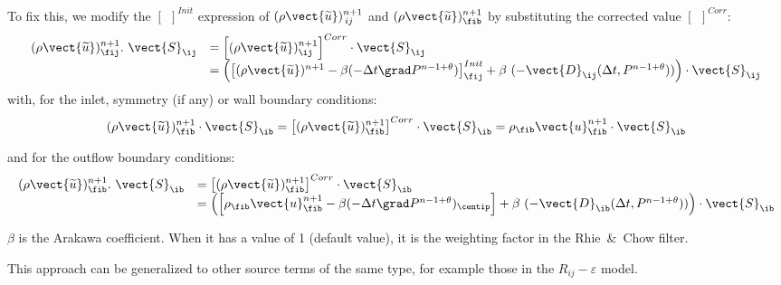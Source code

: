 To fix this, we modify the $\left[{\ \ }\right]^{Init}$ expression of $(\rho
\vect{\widetilde{u}})^{n+1}_{\,ij}$ and $(\rho\vect{\widetilde{u}})^{n+1}_{\fib}$
by substituting the corrected value  $\left[{\ \ }\right]^{Corr}$:
\begin{equation}
\begin{array}{ll}
(\rho \vect{\widetilde{u}})^{n+1}_{\fij}.\ \vect{S}_{\ij}&=
\left[(\rho \vect{\widetilde{u}})^{n+1}_{\ij}\right]^{Corr} \cdot \vect{S}_{\ij}\\
&= \left(\left[(\rho \vect{\widetilde{u}})^{n+1}-\beta(-\Delta t \grad P^{n-1+\theta})\right]^{Init}_{\fij}
+\beta\ (-\vect{D}_{\ij}(\Delta t, P^{n-1+\theta}))\right) \cdot \vect{S}_{\ij}
\end{array}
\end{equation}
with, for the inlet, symmetry (if any) or wall boundary conditions:
\begin{equation}\notag
(\rho \vect{\widetilde{u}})^{n+1}_{\fib} \cdot \vect{S}_{\ib}=\left[(\rho \vect{\widetilde{u}})^{n+1}_{\fib}\right]^{Corr} \cdot \vect{S}_{\ib}=
\rho_{\fib}\vect{u}^{n+1}_{\fib} \cdot \vect{S}_{\ib}
\end{equation}

and for the outflow boundary conditions:
\begin{equation*}
\begin{array}{ll}
(\rho \vect{\widetilde{u}})^{n+1}_{\fib}.\ \vect{S}_{\ib}& =
\left[(\rho \vect{\widetilde{u}})^{n+1}_{\fib}\right]^{Corr} \cdot \vect{S}_{\ib}
\\&= \left( \left[\rho _{\fib}\vect{u}^{n+1}_{\fib}-\beta(-\Delta t
\grad P^{n-1+\theta})_{\centip}\right]+\beta\ (-\vect{D}_{\ib}(\Delta t,
P^{n-1+\theta}))\right) \cdot \vect{S}_{\ib}
\end{array}
\end{equation*}

$\beta$ is the Arakawa coefficient. When it has a value of 1 (default value), it is the weighting factor in the Rhie~\&~Chow filter.

\begin{remark}
This approach can be generalized to other source terms of the same type,
for example those in the $R_{ij}-\varepsilon$ model.
\end{remark}

